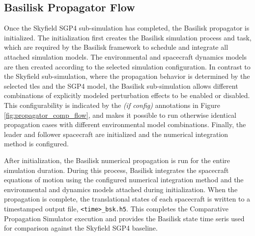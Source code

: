 \subsection{Basilisk Propagator Flow} 
\label{sec:basilisk_propagator_flow}
Once the Skyfield SGP4 sub-simulation has completed, the Basilisk propagator is initialized. The initialization first creates the Basilisk simulation process and task, which are required by the Basilisk framework to schedule and integrate all attached simulation models. The environmental and spacecraft dynamics models are then created according to the selected simulation configuration. In contrast to the Skyfield sub-simulation, where the propagation behavior is determined by the selected \gls{tle}s and the SGP4 model, the Basilisk sub-simulation allows different combinations of explicitly modeled perturbation effects to be enabled or disabled. This configurability is indicated by the \textit{(if config)} annotations in Figure \ref{fig:propagator_comp_flow}, and makes it possible to run otherwise identical propagation cases with different environmental model combinations. Finally, the leader and follower spacecraft are initialized and the numerical integration method is configured.

After initialization, the Basilisk numerical propagation is run for the entire simulation duration. During this process, Basilisk integrates the spacecraft equations of motion using the configured numerical integration method and the environmental and dynamics models attached during initialization. When the propagation is complete, the translational states of each spacecraft is written to a timestamped output file, \texttt{<time>\_bsk.h5}. This completes the Comparative Propagation Simulator execution and provides the Basilisk state time seris used for comparison against the Skyfield SGP4 baseline.

